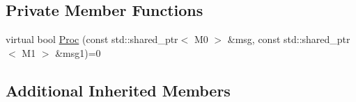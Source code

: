 \subsection*{Private Member Functions}
\begin{DoxyCompactItemize}
\item 
virtual bool \hyperlink{classapollo_1_1cyber_1_1Component_3_01M0_00_01M1_00_01NullType_00_01NullType_01_4_afc67aa49c528e5c692f5f5223a5afab6}{Proc} (const std\-::shared\-\_\-ptr$<$ M0 $>$ \&msg, const std\-::shared\-\_\-ptr$<$ M1 $>$ \&msg1)=0
\end{DoxyCompactItemize}
\subsection*{Additional Inherited Members}



